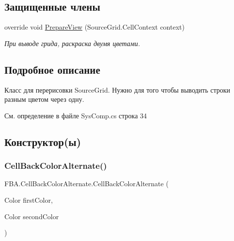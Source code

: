 \subsection*{Защищенные члены}
\begin{DoxyCompactItemize}
\item 
override void \mbox{\hyperlink{class_f_b_a_1_1_cell_back_color_alternate_a05cad53599b4418cd81e2901c07efa35}{Prepare\+View}} (Source\+Grid.\+Cell\+Context context)
\begin{DoxyCompactList}\small\item\em При выводе грида, раскраска двумя цветами. \end{DoxyCompactList}\end{DoxyCompactItemize}


\subsection{Подробное описание}
Класс для перерисовки Source\+Grid. Нужно для того чтобы выводить строки разным цветом через одну. 



См. определение в файле Sys\+Comp.\+cs строка 34



\subsection{Конструктор(ы)}
\mbox{\label{class_f_b_a_1_1_cell_back_color_alternate_a7cae4adaac990284e5b97c306198e579}} 
\subsubsection{\texorpdfstring{Cell\+Back\+Color\+Alternate()}{CellBackColorAlternate()}}
{\footnotesize\ttfamily F\+B\+A.\+Cell\+Back\+Color\+Alternate.\+Cell\+Back\+Color\+Alternate (\begin{DoxyParamCaption}\item[{Color}]{first\+Color,  }\item[{Color}]{second\+Color }\end{DoxyParamCaption})}



